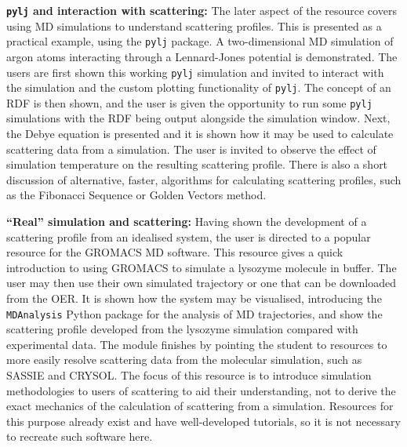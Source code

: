 \textbf{\texttt{pylj} and interaction with scattering:} The later aspect of the resource covers using MD simulations to understand scattering profiles.
This is presented as a practical example, using the \texttt{pylj} package.\autocite{mccluskey_pylj_2018,mccluskey_arm61/pylj_2019-2}
A two-dimensional MD simulation of argon atoms interacting through a Lennard-Jones potential is demonstrated.
The users are first shown this working \texttt{pylj} simulation and invited to interact with the simulation and the custom plotting functionality of \texttt{pylj}.
The concept of an RDF is then shown, and the user is given the opportunity to run some \texttt{pylj} simulations with the RDF being output alongside the simulation window.
Next, the Debye equation\autocite{debye_zerstreuung_1915} is presented and it is shown how it may be used to calculate scattering data from a simulation.
The user is invited to observe the effect of simulation temperature on the resulting scattering profile.
There is also a short discussion of alternative, faster, algorithms for calculating scattering profiles, such as the Fibonacci Sequence or Golden Vectors method.\autocite{watson_rapid_2013,svergun_solution_1994}

\textbf{``Real'' simulation and scattering:} Having shown the development of a scattering profile from an idealised system, the user is directed to a popular resource for the GROMACS\autocite{berendsen_gromacs_1995} MD software.
This resource gives a quick introduction to using GROMACS to simulate a lysozyme molecule in buffer.\autocite{lemkul_gromacs_nodate}
The user may then use their own simulated trajectory or one that can be downloaded from the OER.
It is shown how the system may be visualised, introducing the \texttt{MDAnalysis} Python package for the analysis of MD trajectories,\autocite{michaud-agrawal_mdanalysis_2011,gowers_mdanalysis_2016} and show the scattering profile developed from the lysozyme simulation compared with experimental data.\autocite{franke_correlation_2015}
The module finishes by pointing the student to resources to more easily resolve scattering data from the molecular simulation, such as SASSIE and CRYSOL.\autocite{perkins_atomistic_2016,svergun_crysol_1995}
The focus of this resource is to introduce simulation methodologies to users of scattering to aid their understanding, not to derive the exact mechanics of the calculation of scattering from a simulation.
Resources for this purpose already exist and have well-developed tutorials, so it is not necessary to recreate such software here.
